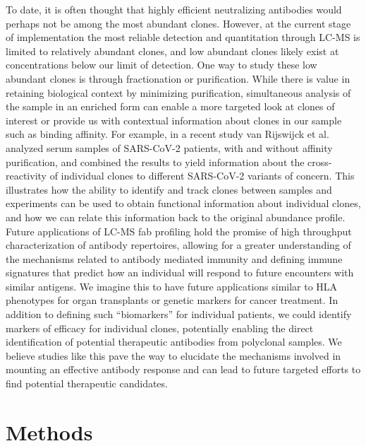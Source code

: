 To date, it is often thought that highly efficient neutralizing antibodies would perhaps not be among the most abundant clones. However, at the current stage of implementation the most reliable detection and quantitation through LC-MS is limited to relatively abundant clones, and low abundant clones likely exist at concentrations below our limit of detection. One way to study these low abundant clones is through fractionation or purification. While there is value in retaining biological context by minimizing purification, simultaneous analysis of the sample in an enriched form can enable a more targeted look at clones of interest or provide us with contextual information about clones in our sample such as binding affinity. For example, in a recent study van Rijswijck et al. \cite{rijswijck2022discriminating} analyzed serum samples of SARS-CoV-2 patients, with and without affinity purification, and combined the results to yield information about the cross-reactivity of individual clones to different SARS-CoV-2 variants of concern. This illustrates how the ability to identify and track clones between samples and experiments can be used to obtain functional information about individual clones, and how we can relate this information back to the original abundance profile. Future applications of LC-MS fab profiling hold the promise of high throughput characterization of antibody repertoires, allowing for a greater understanding of the mechanisms related to antibody mediated immunity and defining immune signatures that predict how an individual will respond to future encounters with similar antigens. We imagine this to have future applications similar to HLA phenotypes for organ transplants or genetic markers for cancer treatment. In addition to defining such “biomarkers” for individual patients, we could identify markers of efficacy for individual clones, potentially enabling the direct identification of potential therapeutic antibodies from polyclonal samples. We believe studies like this pave the way to elucidate the mechanisms involved in mounting an effective antibody response and can lead to future targeted efforts to find potential therapeutic candidates.


\section{Methods}

